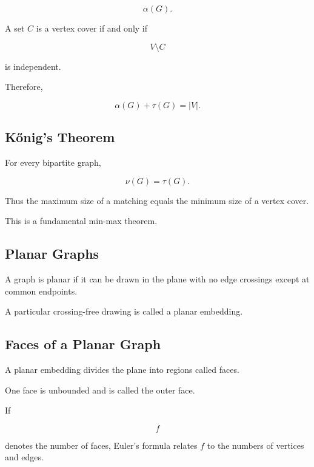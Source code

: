 \[
\boxed{
\alpha(G).
}
\]

A set \(C\) is a vertex cover if and only if

\[
V\setminus C
\]

is independent.

Therefore,

\[
\boxed{
\alpha(G)+\tau(G)=|V|.
}
\]

\subsection{K\H{o}nig's Theorem}
\label{subsec:konigs-theorem}

\begin{theorem}
For every bipartite graph,

\[
\boxed{
\nu(G)=\tau(G).
}
\]
\end{theorem}

Thus the maximum size of a matching equals the minimum size of a vertex
cover.

This is a fundamental min-max theorem.

\subsection{Planar Graphs}
\label{subsec:planar-graphs}

A graph is planar if it can be drawn in the plane with no edge
crossings except at common endpoints.

A particular crossing-free drawing is called a planar embedding.

\subsection{Faces of a Planar Graph}
\label{subsec:planar-faces}

A planar embedding divides the plane into regions called faces.

One face is unbounded and is called the outer face.

If

\[
f
\]

denotes the number of faces, Euler's formula relates \(f\) to the
numbers of vertices and edges.

